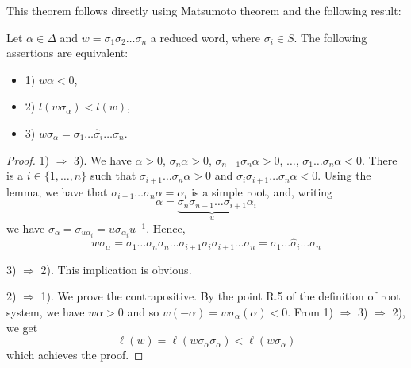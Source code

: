 This theorem follows directly using Matsumoto theorem and the following result:

\begin{theorem}
Let $\alpha \in \Delta$ and $w = \sigma_1 \sigma_2 \ldots \sigma_n$ a reduced word, where $\sigma_i \in S$. The following assertions are equivalent:
\begin{itemize}
\item 1) $w \alpha < 0$,
\item 2) $l(w \sigma_\alpha) < l(w)$,
\item 3) $w \sigma_\alpha = \sigma_1 \ldots \hat{\sigma}_i \ldots \sigma_n$.
\end{itemize}
\end{theorem}
\begin{proof}
1) $\Rightarrow$ 3). We have $\alpha> 0$, $\sigma_n \alpha > 0$, $\sigma_{n-1}\sigma_n \alpha > 0$, $\ldots$, $\sigma_1 \ldots \sigma_n \alpha <0$. There is a $i \in \{1, \ldots, n\}$ such that $\sigma_{i+1} \ldots \sigma_n \alpha > 0$ and $\sigma_i \sigma_{i+1} \ldots \sigma_n \alpha < 0$. Using the lemma, we have that $\sigma_{i+1} \ldots \sigma_n \alpha = \alpha_i$ is a simple root, and, writing
\begin{equation}
\alpha =  \underbrace{\sigma_n \sigma_{n-1} \ldots \sigma_{i+1}}_{u} \alpha_i
\end{equation} we have $\sigma_\alpha = \sigma_{u \alpha_i} = u \sigma_{\alpha_i} u^{-1}$. Hence,
\begin{equation}
w \sigma_\alpha = \sigma_1 \ldots \sigma_n \sigma_n \ldots \sigma_{i+1} \sigma_i \sigma_{i+1} \ldots \sigma_n = \sigma_1 \ldots \hat{\sigma}_i \ldots \sigma_n
\end{equation}


3) $\Rightarrow$ 2). This implication is obvious.

2) $\Rightarrow$ 1). We prove the contrapositive. By the point R.5 of the definition of root system, we have $w \alpha > 0$ and so $w(-\alpha) = w \sigma_\alpha (\alpha) < 0$. From 1) $\Rightarrow$ 3) $\Rightarrow$ 2), we get
\begin{equation}
\ell (w) = \ell (w \sigma_\alpha \sigma_\alpha) < \ell (w \sigma_\alpha)
\end{equation}  which achieves the proof.

\end{proof}


